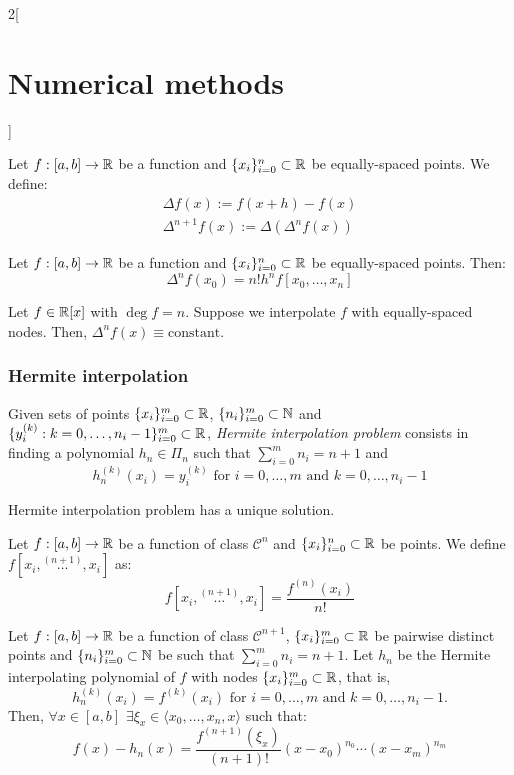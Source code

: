 \documentclass[../../../main.tex]{subfiles}
\begin{document}
\begin{multicols}{2}[\section{Numerical methods}]
\begin{prop}
\end{prop}
\begin{definition}
    Let $f:[a,b]\rightarrow\mathbb{R}$ be a function and $\{x_i\}_{i=0}^n\subset\mathbb{R}$ be equally-spaced points. We define:
    \begin{gather*}
        \Delta f(x):=f(x+h)-f(x)\\
        \Delta^{n+1}f(x):=\Delta(\Delta^nf(x))
    \end{gather*}
\end{definition}
\begin{lemma}
    Let $f:[a,b]\rightarrow\mathbb{R}$ be a function and $\{x_i\}_{i=0}^n\subset\mathbb{R}$ be equally-spaced points. Then: $$\Delta^nf(x_0)=n!h^nf[x_0,\ldots,x_n]$$
\end{lemma}
\begin{corollary}
    Let $f\in\mathbb{R}[x]$ with $\deg f=n$. Suppose we interpolate $f$ with equally-spaced nodes. Then, $\Delta^nf(x)\equiv\text{constant}$.
\end{corollary}
\subsubsection*{Hermite interpolation}
\begin{definition}
    Given sets of points $\{x_i\}_{i=0}^m\subset\mathbb{R}$, $\{n_i\}_{i=0}^m\subset\mathbb{N}$ and $\{y_i^{(k)}:k=0,\ldots,n_i-1\}_{i=0}^m\subset\mathbb{R}$, \textit{Hermite interpolation problem} consists in finding a polynomial $h_n\in\Pi_n$ such that $\sum_{i=0}^mn_i=n+1$ and $$h_n^{(k)}(x_i)=y_i^{(k)}\text{ for }i=0,\ldots,m\text{ and }k=0,\ldots,n_i-1$$
\end{definition}
\begin{prop}
    Hermite interpolation problem has a unique solution.
\end{prop}
\begin{definition}
    Let $f:[a,b]\rightarrow\mathbb{R}$ be a function of class $\mathcal{C}^n$ and $\{x_i\}_{i=0}^n\subset\mathbb{R}$ be points. We define $f[x_i,\overset{(n+1)}{\ldots},x_i]$ as: $$f[x_i,\overset{(n+1)}{\ldots},x_i]=\frac{f^{(n)}(x_i)}{n!}$$
\end{definition}
\begin{theorem}
    Let $f:[a,b]\rightarrow\mathbb{R}$ be a function of class $\mathcal{C}^{n+1}$, $\{x_i\}_{i=0}^m\subset\mathbb{R}$ be pairwise distinct points and $\{n_i\}_{i=0}^m\subset\mathbb{N}$ be such that $\sum_{i=0}^mn_i=n+1$. Let $h_n$ be the Hermite interpolating polynomial of $f$ with nodes $\{x_i\}_{i=0}^m\subset\mathbb{R}$, that is, $$h_n^{(k)}(x_i)=f^{(k)}(x_i)\text{ for }i=0,\ldots,m\text{ and }k=0,\ldots,n_i-1.$$ Then, $\forall x\in[a,b]$ $\exists\xi_x\in\langle x_0,\ldots,x_n,x\rangle$ such that: $$f(x)-h_n(x)=\frac{f^{(n+1)}(\xi_x)}{(n+1)!}(x-x_0)^{n_0}\cdots(x-x_m)^{n_m}$$
\end{theorem}

\end{multicols}
\end{document}
